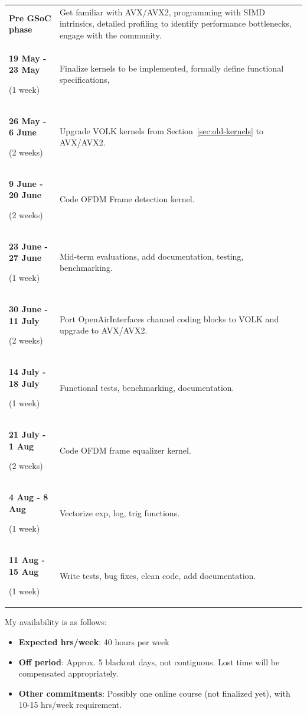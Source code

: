 \documentclass[a4paper,12pt,oneside]{article}
\begin{document}
\begin{table}[H]
\centering
\begin{tabular}{>{\bfseries}p{3.8cm} p{10.2cm}}
\hline
Pre GSoC phase & Get familiar with AVX/AVX2, programming with SIMD intrinsics, detailed profiling to identify performance bottlenecks, engage with the community. \\ 
19 May - 23 May \par \textnormal{(1 week)} & Finalize kernels to be implemented, formally define functional specifications,  \\
26 May - 6 June \par \textnormal{(2 weeks)} & Upgrade VOLK kernels from Section~\ref{sec:old-kernels} to AVX/AVX2. \\
9 June - 20 June \par \textnormal{(2 weeks)} & Code OFDM Frame detection kernel. \\ 
23 June - 27 June \par \textnormal{(1 week)} & Mid-term evaluations, add documentation, testing, benchmarking. \\ 
30 June - 11 July \par \textnormal{(2 weeks)} & Port OpenAirInterfaces channel coding blocks to VOLK and upgrade to AVX/AVX2. \\ 
14 July - 18 July \par \textnormal{(1 week)} & Functional tests, benchmarking, documentation. \\ 
21 July - 1 Aug \par \textnormal{(2 weeks)} & Code OFDM frame equalizer kernel. \\ 
4 Aug - 8 Aug \par \textnormal{(1 week)} & Vectorize exp, log, trig functions. \\ 
11 Aug - 15 Aug \par \textnormal{(1 week)} & Write tests, bug fixes, clean code, add documentation. \\ 
\hline
\end{tabular}
\end{table}

My availability is as follows:

\begin{itemize}
\item \textbf{Expected hrs/week}: 40 hours per week
\item \textbf{Off period}: Approx. 5 blackout days, not contiguous. Lost time will be compensated appropriately.
\item \textbf{Other commitments}: Possibly one online course (not finalized yet), with 10-15 hrs/week requirement.
\end{itemize}
\end{document}
